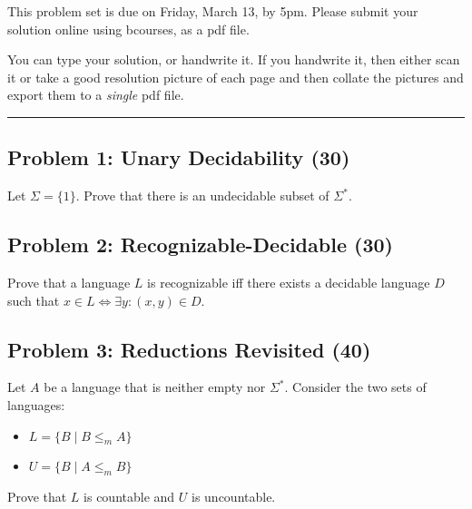 \documentclass{article}
\begin{document}


This problem set is due on Friday, March 13, by 5pm. Please submit your solution online using bcourses,
as a pdf file. 

You can type your solution, or handwrite it. If you handwrite it, then either
scan it or take a good resolution picture of each page and then collate the pictures
and export them to a {\em single} pdf file.

\bigskip

\hrule




\subsection*{Problem 1: Unary Decidability (30)}

Let $\Sigma = \{1 \}$. Prove that there is an undecidable subset of $\Sigma^*$.

\subsection*{Problem 2: Recognizable-Decidable (30)}

Prove that a language $L$ is recognizable iff there exists a decidable language $D$ such that
$x \in L \Leftrightarrow \exists y: (x,y) \in D$.

\subsection*{Problem 3: Reductions Revisited (40)}

Let $A$ be a language that is neither empty nor $\Sigma^*$.
Consider the two sets of languages:

\begin{itemize}
  \item $L = \{ B \mid B \leq_m A \}$
  \item $U = \{ B \mid A \leq_m B \}$
\end{itemize}

\noindent Prove that $L$ is countable and $U$ is uncountable.
\end{document}
